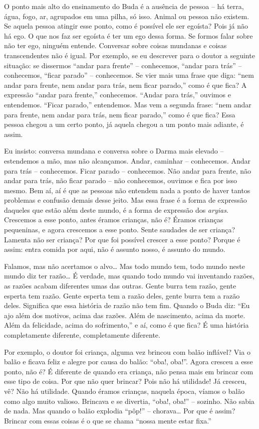 O ponto mais alto do ensinamento do Buda é a ausência de pessoa – há
terra, água, fogo, ar, agrupados em uma pilha, só isso. Animal ou
pessoa não existem. Se aquela pessoa atingir esse ponto, como é
possível ele ser egoísta? Pois já não há ego. O que nos faz ser egoísta
é ter um ego dessa forma. Se formos falar sobre não ter ego, ninguém
entende. Conversar sobre coisas mundanas e coisas transcendentes não é
igual. Por exemplo, se eu descrever para o doutor a seguinte situação:
se dissermos “andar para frente” – conhecemos, “andar para trás” –
conhecemos, “ficar parado” – conhecemos. Se vier mais uma frase que
diga: “nem andar para frente, nem andar para trás, nem ficar parado,”
como é que fica? A expressão “andar para frente,” conhecemos. “Andar
para trás,” ouvimos e entendemos. “Ficar parado,” entendemos. Mas vem a
segunda frase: “nem andar para frente, nem andar para trás, nem ficar
parado,” como é que fica? Essa pessoa chegou a um certo ponto, já
aquela chegou a um ponto mais adiante, é assim.

Eu insisto: conversa mundana e conversa sobre o Darma mais elevado –
estendemos a mão, mas não alcançamos. Andar, caminhar – conhecemos.
Andar para trás – conhecemos. Ficar parado – conhecemos. Não andar para
frente, não andar para trás, não ficar parado – não conhecemos, ouvimos
e fica por isso mesmo. Bem aí, aí é que as pessoas não entendem nada a
ponto de haver tantos problemas e confusão demais desse jeito. Mas essa
frase é a forma de expressão daqueles que estão além deste mundo, é a
forma de expressão dos \textit{aryias}.
Crescemos a esse ponto, antes éramos crianças, não
é? Éramos crianças pequeninas, e agora crescemos a esse ponto. Sente
saudades de ser criança? Lamenta não ser criança? Por que foi possível
crescer a esse ponto? Porque é assim: entra comida por aqui, não é
assunto nosso, é assunto do mundo. 

Falamos, mas não acertamos o alvo… Mas todo mundo tem, todo mundo
neste mundo diz ter razão… É verdade, mas quando todo mundo vai
inventando razões, as razões acabam diferentes umas das outras. Gente
burra tem razão, gente esperta tem razão. Gente esperta tem a razão
deles, gente burra tem a razão deles. Significa que essa história de
razão não tem fim. Quando o Buda diz: “Eu ajo além dos motivos, acima
das razões. Além de nascimento, acima da morte. Além da felicidade,
acima do sofrimento,” e aí, como é que fica? É uma história
completamente diferente, completamente diferente. 

Por exemplo, o doutor foi criança, alguma vez brincou com balão
inflável? Via o balão e ficava feliz e alegre por causa do balão:
“oba!, oba!”. Agora cresceu a esse ponto, não é? É diferente de quando
era criança, não pensa mais em brincar com esse tipo de coisa. Por que
não quer brincar? Pois não há utilidade! Já cresceu, vê? Não há
utilidade. Quando éramos crianças, naquela época, víamos o balão como
algo muito valioso. Brincava e se divertia, “oba!, oba!” – sozinho. Não
sabia de nada. Mas quando o balão explodia “pôp!” – chorava… Por que é
assim? Brincar com essas coisas é o que se chama “nossa mente estar
fixa.” 

